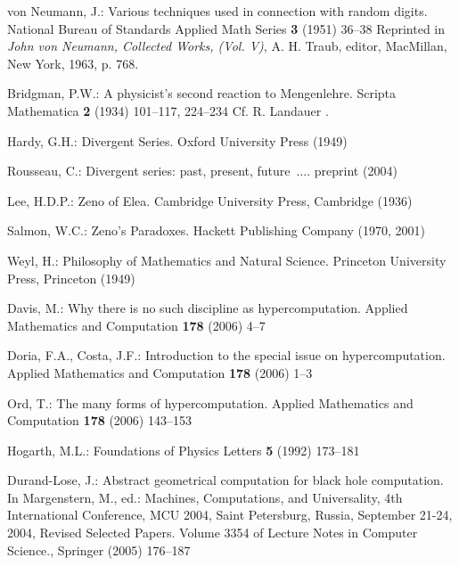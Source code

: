 \documentclass{llncs}
\begin{document}
\begin{thebibliography}{10}

von Neumann, J.:
\newblock Various techniques used in connection with random digits.
\newblock National Bureau of Standards Applied Math Series \textbf{3} (1951)
  36--38 Reprinted in {\sl John von Neumann, Collected Works, (Vol. V)}, A. H.
  Traub, editor, MacMillan, New York, 1963, p. 768.

Bridgman, P.W.:
\newblock A physicist's second reaction to {M}engenlehre.
\newblock Scripta Mathematica \textbf{2} (1934)  101--117, 224--234 Cf. R.
  Landauer \cite{landauer-95}.

Hardy, G.H.:
\newblock Divergent Series.
\newblock Oxford University Press (1949)

Rousseau, C.:
\newblock Divergent series: past, present, future~$\ldots$.
\newblock preprint (2004)

Lee, H.D.P.:
\newblock Zeno of Elea.
\newblock Cambridge University Press, Cambridge (1936)

Salmon, W.C.:
\newblock Zeno's Paradoxes.
\newblock Hackett Publishing Company (1970, 2001)

Weyl, H.:
\newblock Philosophy of Mathematics and Natural Science.
\newblock Princeton University Press, Princeton (1949)

Davis, M.:
\newblock Why there is no such discipline as hypercomputation.
\newblock Applied Mathematics and Computation \textbf{178} (2006)  4--7

Doria, F.A., Costa, J.F.:
\newblock Introduction to the special issue on hypercomputation.
\newblock Applied Mathematics and Computation \textbf{178} (2006)  1--3

Ord, T.:
\newblock The many forms of hypercomputation.
\newblock Applied Mathematics and Computation \textbf{178} (2006)  143--153

Hogarth, M.L.:
\newblock Foundations of Physics Letters \textbf{5} (1992)  173--181

Durand-Lose, J.:
\newblock Abstract geometrical computation for black hole computation.
\newblock In Margenstern, M., ed.: Machines, Computations, and Universality,
  4th International Conference, MCU 2004, Saint Petersburg, Russia, September
  21-24, 2004, Revised Selected Papers. Volume 3354 of Lecture Notes in
  Computer Science., Springer (2005)  176--187


\end{thebibliography}
\end{document}
